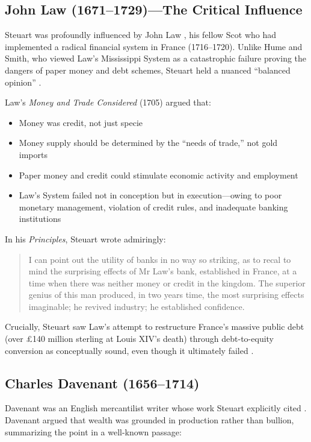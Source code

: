 \documentclass[12pt]{article}
\begin{document}
\subsection{John Law (1671--1729)---The Critical Influence}

Steuart was profoundly influenced by John Law \citep{law1705}, his fellow Scot who had implemented a radical financial system in France (1716--1720). Unlike Hume and Smith, who viewed Law's Mississippi System as a catastrophic failure proving the dangers of paper money and debt schemes, Steuart held a nuanced ``balanced opinion'' \citep{bentemessek_betancourt2012}.

Law's \textit{Money and Trade Considered} (1705) argued that:

\begin{itemize}
\item Money was credit, not just specie
\item Money supply should be determined by the ``needs of trade,'' not gold imports
\item Paper money and credit could stimulate economic activity and employment
\item Law's System failed not in conception but in execution---owing to poor monetary management, violation of credit rules, and inadequate banking institutions
\end{itemize}

In his \textit{Principles}, Steuart wrote admiringly:

\begin{quote}
I can point out the utility of banks in no way so striking, as to recal to mind the surprising effects of Mr Law's bank, established in France, at a time when there was neither money or credit in the kingdom. The superior genius of this man produced, in two years time, the most surprising effects imaginable; he revived industry; he established confidence.
\end{quote}

Crucially, Steuart saw Law's attempt to restructure France's massive public debt (over £140 million sterling at Louis XIV's death) through debt-to-equity conversion as conceptually sound, even though it ultimately failed \citep{velde2003, murphy1997}.

\subsection{Charles Davenant (1656--1714)}

Davenant was an English mercantilist writer whose work Steuart explicitly cited \citep{davenant1698}. Davenant argued that wealth was grounded in production rather than bullion, summarizing the point in a well-known passage:
\end{document}
